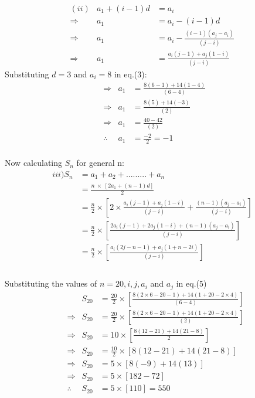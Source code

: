 \documentclass[journal, 12pt, twocolumn]{IEEEtran}
\begin{document}
    
     \begin{align*}
        &(ii)&a_1 + (i-1)d &= a_i\\
        &\Rightarrow & a_1 &= a_i - (i-1)d\\
        &\Rightarrow & a_1 &=  a_i - \tfrac{(i-1)(a_j - a_i)}{(j-i)} \;\;\;\\ 
        &\Rightarrow & a_1 &=  \tfrac{a_i(j-1)+a_j(1-i)}{(j-i)}\tag{3} \; 
         \end{align*}
Substituting $d=3$ and $a_i=8$  in eq.(3):
\begin{align*}
    &\Rightarrow & a_1 &= \tfrac{8(6-1)+14(1-4)}{(6-4)}  \;\\
    &\Rightarrow & a_1 &= \tfrac{8(5)+14(-3)}{(2)}  \;\\
    &\Rightarrow & a_1 &= \tfrac{40-42}{(2)}  \;\\
   &\therefore &  a_1 &= \tfrac{-2}{2} = -1 \tag{4}\\
\end{align*}         
    
Now calculating $S_n$ for general n:   
    \begin{align*}
        iii)  S_{n} &= a_1 + a_2 + ......... + a_{n}\\
               &= \tfrac{n\;\times\;\left[2a_1 + (n-1)d\right]}{2} \\
               &= \tfrac{n}{2}\times\left[2\times\tfrac{a_i(j-1)+a_j(1-i)}{(j-i)} + \tfrac{(n-1)(a_j - a_i)}{(j-i)}\right]\\
               &= \tfrac{n}{2}\times\left[\tfrac{2a_i(j-1)+2a_j(1-i)+(n-1)(a_j - a_i)}{(j-i)}\right]\\
               &= \tfrac{n}{2}\times\left[\tfrac{a_i(2j-n-1)+a_j(1+n-2i)}{(j-i)}\right]\tag{5}\\\\
    \end{align*}

Substituting the values of $n=20,i,j,a_i$ and $a_j$ in eq.(5) 
 \begin{align*}
    &  & S_{20}  &= \tfrac{20}{2}\times\left[\tfrac{8(2\times6-20-1)+14(1+20-2\times4)}{(6-4)}\right]\\
& \Rightarrow & S_{20}&=\tfrac{20}{2}\times\left[\tfrac{8(2\times6-20-1)+14(1+20-2\times4)}{(2)}\right]\\
& \Rightarrow & S_{20} &= 10\times\left[\tfrac{8(12-21)+14(21-8)}{2}\right]\\
& \Rightarrow & S_{20} &= \tfrac{10}{2}\times\left[8(12-21)+14(21-8)\right]\\
& \Rightarrow & S_{20} &= 5\times\left[8(-9)+14(13)\right]\\
& \Rightarrow & S_{20} &= 5\times\left[182-72\right]\\
& \therefore & S_{20} &= 5\times\left[110\right] = 550\\
\end{align*}

    
    
\end{document}
